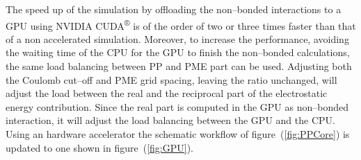 The speed up of the simulation by offloading the non--bonded interactions to a GPU using NVIDIA CUDA\textsuperscript{®} is of the order of two or three times faster than that of a non accelerated simulation. Moreover, to increase the performance, avoiding the waiting time of the CPU for the GPU to finish the non--bonded calculations, the same load balancing between \ac{PP} and \ac{PME} part can be used. Adjusting both the Coulomb cut--off and \ac{PME} grid spacing, leaving the ratio unchanged, will adjust the load between the real and the reciprocal part of the electrostatic energy contribution. Since the real part is computed in the GPU as non--bonded interaction, it will adjust the load balancing between the GPU and the CPU. Using an hardware accelerator the schematic workflow of figure~(\ref{fig:PPCore}) is updated to one shown in figure~(\ref{fig:GPU}).

